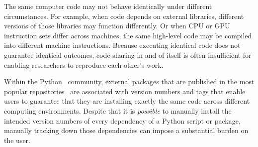 \documentclass[preprint,12pt,a4paper]{elsarticle}
\begin{document}
The same computer code may not behave identically under different
circumstances.  For example, when code depends on external libraries,
different versions of those libraries may function differently.  Or
when CPU or GPU instruction sets differ across machines, the same
high-level code may be compiled into different machine instructions.
Because executing identical code does not guarantee identical
outcomes, code sharing in and of itself is often insufficient for
enabling researchers to reproduce each other's work.

Within the Python~\cite{vanR95} community, external
packages that are published in the most popular
repositories~\cite{pypi, cond15} are associated with version numbers
and tags that enable users to guarantee that they are installing
exactly the same code across different computing environments.
Despite that it is \textit{possible} to manually install the intended
version numbers of every dependency of a Python script or package, manually
tracking down those dependencies can impose a substantial burden on
the user.
\end{document}
